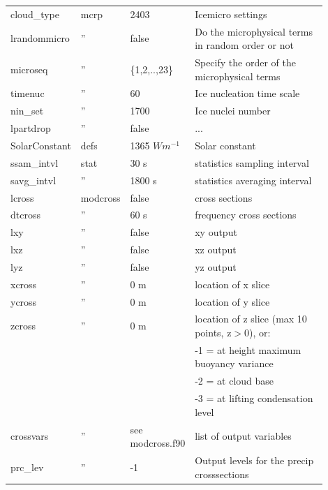 \documentclass[11pt,a4paper]{article}
\begin{document}
\begin{longtable}[htb]{p{0.12\linewidth}p{0.1\linewidth}p{0.18\linewidth}p{0.5\linewidth}}
\hline
cloud\_type  & mcrp & 2403                & Icemicro settings      \\
lrandommicro &  ''  & false               & Do the microphysical terms in random order or not                                 \\
microseq     &  ''  & \{1,2,..,23\}       & Specify the order of the microphysical terms      \\
timenuc      &  ''  & 60                  & Ice nucleation time scale                                   \\
nin\_set     &  ''  & 1700                & Ice nuclei number  \\
lpartdrop    &  ''  & false               & ...                                                   \\
\hline
SolarConstant& defs & 1365 $Wm^{-1}$      & Solar constant                                        \\ 
\hline
ssam\_intvl  & stat & 30 s                & statistics sampling interval                          \\
savg\_intvl  &  ''  & 1800 s              & statistics averaging interval                         \\
\hline
lcross       & modcross & false              & cross sections                                     \\
dtcross      &  ''  & 60 s                & frequency cross sections                              \\
lxy          &  ''  & false               & xy output                                             \\
lxz          &  ''  & false               & xz output                                             \\
lyz          &  ''  & false               & yz output                                             \\
xcross       &  ''  & 0 m                 & location of x slice                                   \\
ycross       &  ''  & 0 m                 & location of y slice                                   \\
zcross       &  ''  & 0 m                 & location of z slice (max 10 points, z$>$0), or:       \\
             &      &                     & \hspace{2mm} -1 = at height maximum buoyancy variance \\
             &      &                     & \hspace{2mm} -2 = at cloud base                       \\
             &      &                     & \hspace{2mm} -3 = at lifting condensation level       \\
crossvars    &  ''  & see modcross.f90    & list of output variables                              \\
prc\_lev     &  ''  & -1                  & Output levels for the precip crosssections     \\


\end{longtable}
\end{document}
